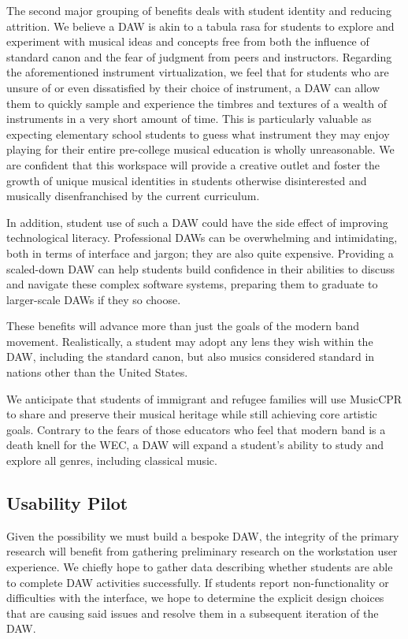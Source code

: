 \documentclass[manuscript,screen,review]{acmart}
\begin{document}
The second major grouping of benefits deals with student identity and reducing attrition.
We believe a DAW is akin to a tabula rasa for students to explore and experiment with musical ideas and concepts free from both the influence of standard canon and the fear of judgment from peers and instructors.
Regarding the aforementioned instrument virtualization, we feel that for students who are unsure of or even dissatisfied by their choice of instrument, a DAW can allow them to quickly sample and experience the timbres and textures of a wealth of instruments in a very short amount of time.
This is particularly valuable as expecting elementary school students to guess what instrument they may enjoy playing for their entire pre-college musical education is wholly unreasonable.
We are confident that this workspace will provide a creative outlet and foster the growth of unique musical identities in students otherwise disinterested and musically disenfranchised by the current curriculum.

In addition, student use of such a DAW could have the side effect of improving technological literacy.
Professional DAWs can be overwhelming and intimidating, both in terms of interface and jargon; they are also quite expensive.
Providing a scaled-down DAW can help students build confidence in their abilities to discuss and navigate these complex software systems, preparing them to graduate to larger-scale DAWs if they so choose.

These benefits will advance more than just the goals of the modern band movement.
Realistically, a student may adopt any lens they wish within the DAW, including the standard canon, but also musics considered standard in nations other than the United States.

We anticipate that students of immigrant and refugee families will use MusicCPR to share and preserve their musical heritage while still achieving core artistic goals.
Contrary to the fears of those educators who feel that modern band is a death knell for the WEC, a DAW will expand a student's ability to study and explore all genres, including classical music.


\subsection{Usability Pilot}
Given the possibility we must build a bespoke DAW, the integrity of the primary research will benefit from gathering preliminary research on the workstation user experience.
We chiefly hope to gather data describing whether students are able to complete DAW activities successfully.
If students report non-functionality or difficulties with the interface, we hope to determine the explicit design choices that are causing said issues and resolve them in a subsequent iteration of the DAW.
\end{document}
